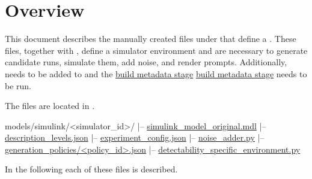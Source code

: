 \documentclass[11pt]{article}
\begin{document}
\newcommand{\environmentBuildMetadataStageLink}{%
  \ifdefined\tsenvDocsCombinedManualMode
    \hyperref[sec:simulink-build-metadata-stage]{build metadata stage}%
  \else
    \href{simulink_generated_metadata_schema.pdf}{build metadata stage}%
  \fi
}

\label{docstart:environment_profiles}

\section*{Overview}

This document describes the manually created files under  that define a \name{} \termSimulator.
These files, together with  , define a simulator environment and are necessary to generate candidate runs, simulate them, add noise, and render prompts. 
\label{sec:allowed-tsenv-models}
Additionally, \termSimulator needs to be added to \hyperref[sec:allowed-tsenv-models]{} and the \environmentBuildMetadataStageLink{} needs to be run.


The files are located in .
\newcommand{\environmentTreeSimulinkModelOriginal}{\hyperref[sec:environment-simulink-model-original]{simulink\_model\_original.mdl}}
\newcommand{\environmentTreeDescriptionLevels}{\hyperref[sec:environment-description-levels]{description\_levels.json}}
\newcommand{\environmentTreeExperimentConfig}{\hyperref[sec:environment-experiment-config]{experiment\_config.json}}
\newcommand{\environmentTreeNoiseAdder}{\hyperref[sec:environment-noise-adder]{noise\_adder.py}}
\newcommand{\environmentTreeGenerationPolicy}{\hyperref[sec:generation-policy-schema]{generation\_policies/\textless policy\_id\textgreater.json}}
\newcommand{\environmentTreeDetectabilitySpecific}{\hyperref[sec:environment-detectability-specific]{detectability\_specific\_environment.py}}
\begin{LinkedDocCode}
models/simulink/<simulator_id>/
|-- \environmentTreeSimulinkModelOriginal
|-- \environmentTreeDescriptionLevels
|-- \environmentTreeExperimentConfig
|-- \environmentTreeNoiseAdder
|-- \environmentTreeGenerationPolicy
|-- \environmentTreeDetectabilitySpecific\quad
\end{LinkedDocCode}

In the following each of these files is described.
\label{sec:generation-policy-schema}
\end{document}
